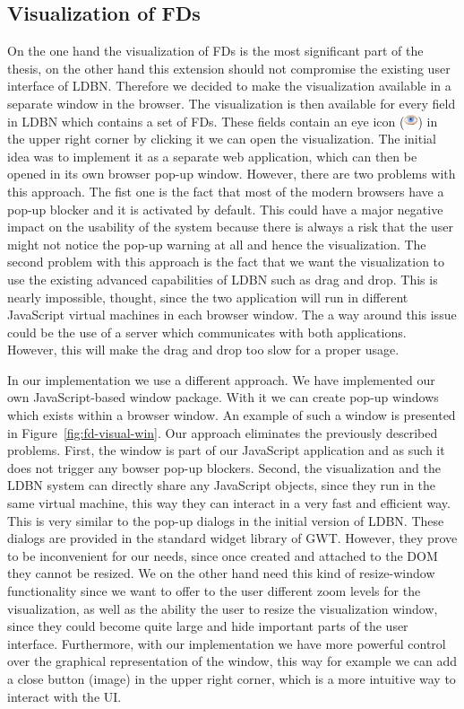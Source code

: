\subsection{Visualization of FDs}
\label{sec:visualization}
On the one hand the visualization of FDs is the most significant 
part of the thesis, 
on the other hand this extension should not compromise the existing 
user interface of LDBN. Therefore we decided to
make the visualization available in a separate window in the browser. 
The visualization is then available for every field in LDBN which 
contains a set of FDs. These fields contain an eye icon (\includegraphics[scale=0.6]{./img/eye.png}) in the upper right
corner by clicking it we can open the visualization.
The initial idea
was to implement it as a separate web application, which can then be 
opened in its own 
browser pop-up window. However, there are two problems with this approach. The fist one is
the fact that most of the modern browsers have a pop-up blocker and it is activated by default.
This could have a major negative impact on the usability of the system because there
is always a risk that the user might not notice the pop-up 
warning at all and hence the visualization. The second problem with this approach is 
the fact that we want the visualization to use the existing 
advanced capabilities of LDBN such as drag and drop. This is nearly impossible, thought, since
the two application will run in different JavaScript virtual machines in each
browser window. The a way around this issue could be the use of a server
which communicates with both applications. However, 
this will make the drag and drop too slow for a proper usage. 



In our implementation we use a different approach. We have implemented our own 
JavaScript-based window package.
With it we can create pop-up windows which exists within a browser window. 
An example of such a window is presented in Figure~\ref{fig:fd-visual-win}. 
Our approach eliminates the previously described problems. First,
the window is part of our JavaScript application and as such it does not 
trigger any bowser pop-up
blockers. Second, the visualization and the LDBN system can directly share any 
JavaScript objects, since they run in the same virtual machine, 
this way they can interact in a very fast and efficient way. 
This is very similar to the pop-up dialogs in the initial version of LDBN. 
These dialogs are provided in the standard widget library of GWT. 
However, they prove to be inconvenient for our needs, since once created and attached 
to the DOM they cannot be resized. We on the other hand
need this kind of resize-window functionality since we want to offer to the user
different zoom levels for the visualization, as well as the ability the user to resize the
visualization window, since they could become quite large and hide important parts of the user 
interface. Furthermore, with our implementation we have more powerful control over
the graphical representation of the window, this way for example we can add a close button (image)
in the upper right corner, which is a more intuitive way to interact with the UI.

